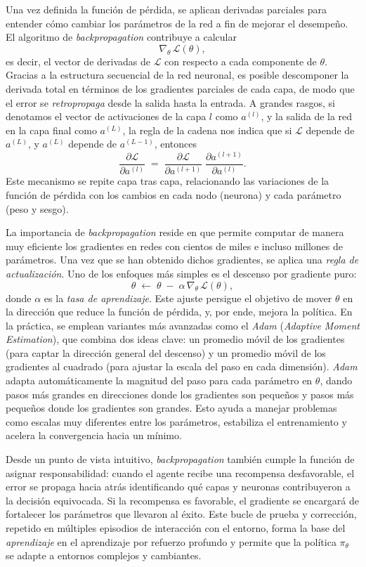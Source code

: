 \documentclass[11pt,a4paper,spanish]{article}
\numberwithin{equation}{section} %
\begin{document}
Una vez definida la función de pérdida, se aplican derivadas parciales para entender cómo cambiar los parámetros de la red a fin de mejorar el desempeño. El algoritmo de \textit{backpropagation} contribuye a calcular
\[
\nabla_\theta\, \mathcal{L}(\theta),
\]
es decir, el vector de derivadas de \(\mathcal{L}\) con respecto a cada componente de \(\theta\). Gracias a la estructura secuencial de la red neuronal, es posible descomponer la derivada total en términos de los gradientes parciales de cada capa, de modo que el error se \emph{retropropaga} desde la salida hasta la entrada. A grandes rasgos, si denotamos el vector de activaciones de la capa \(l\) como \(a^{(l)}\), y la salida de la red en la capa final como \(a^{(L)}\), la regla de la cadena nos indica que si \(\mathcal{L}\) depende de \(a^{(L)}\), y \(a^{(L)}\) depende de \(a^{(L-1)}\), entonces
\[
\frac{\partial \mathcal{L}}{\partial a^{(l)}} 
\;=\; 
\frac{\partial \mathcal{L}}{\partial a^{(l+1)}} \; \frac{\partial a^{(l+1)}}{\partial a^{(l)}}.
\]
Este mecanismo se repite capa tras capa, relacionando las variaciones de la función de pérdida con los cambios en cada nodo (neurona) y cada parámetro (peso y sesgo).

La importancia de \textit{backpropagation} reside en que permite computar de manera muy eficiente los gradientes en redes con cientos de miles e incluso millones de parámetros. Una vez que se han obtenido dichos gradientes, se aplica una \emph{regla de actualización}. Uno de los enfoques más simples es el descenso por gradiente puro:
\[
\theta \;\leftarrow\; \theta \;-\; \alpha\, \nabla_{\theta}\, \mathcal{L}(\theta),
\]
donde \(\alpha\) es la \textit{tasa de aprendizaje}. Este ajuste persigue el objetivo de mover \(\theta\) en la dirección que reduce la función de pérdida, y, por ende, mejora la política. En la práctica, se emplean variantes más avanzadas como el \textit{Adam} (\textit{Adaptive Moment Estimation}), que combina dos ideas clave: un promedio móvil de los gradientes (para captar la dirección general del descenso) y un promedio móvil de los gradientes al cuadrado (para ajustar la escala del paso en cada dimensión). \textit{Adam} adapta automáticamente la magnitud del paso para cada parámetro en \(\theta\), dando pasos más grandes en direcciones donde los gradientes son pequeños y pasos más pequeños donde los gradientes son grandes. Esto ayuda a manejar problemas como escalas muy diferentes entre los parámetros, estabiliza el entrenamiento y acelera la convergencia hacia un mínimo.


Desde un punto de vista intuitivo, \textit{backpropagation} también cumple la función de asignar responsabilidad: cuando el agente recibe una recompensa desfavorable, el error se propaga hacia atrás identificando qué capas y neuronas contribuyeron a la decisión equivocada. Si la recompensa es favorable, el gradiente se encargará de fortalecer los parámetros que llevaron al éxito. Este bucle de prueba y corrección, repetido en múltiples episodios de interacción con el entorno, forma la base del \emph{aprendizaje} en el aprendizaje por refuerzo profundo y permite que la política \(\pi_\theta\) se adapte a entornos complejos y cambiantes. 
\end{document}

